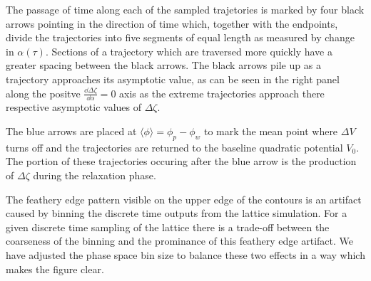 {\begin{figure*}
{    %
    The passage of time along each of the sampled trajetories is marked by four black arrows pointing in the direction of time which, together with the endpoints, divide the trajectories into five segments of equal length as measured by change in $\alpha(\tau)$. Sections of a trajectory which are traversed more quickly have a greater spacing between the black arrows.
    The black arrows pile up as a trajectory approaches its asymptotic value, as can be seen in the right panel along the positve $\frac{\dd\Delta\zeta}{\dd\alpha}=0$ axis as the extreme trajectories approach there respective asymptotic values of $\Delta\zeta$.
    
    The blue arrows are placed at $\langle\phi\rangle = \phi_p - \phi_w$ to mark the mean point where $\Delta V$ turns off and the trajectories are returned to the baseline quadratic potential $V_0$. The portion of these trajectories occuring after the blue arrow is the production of $\Delta\zeta$ during the relaxation phase.

    The feathery edge pattern visible on the upper edge of the contours is an artifact caused by binning the discrete time outputs from the lattice simulation. For a given discrete time sampling of the lattice there is a trade-off between the coarseness of the binning and the prominance of this feathery edge artifact. We have adjusted the phase space bin size to balance these two effects in a way which makes the figure clear.    
    }
    \label{fig:zetapstraj}
  \end{figure*}
}

